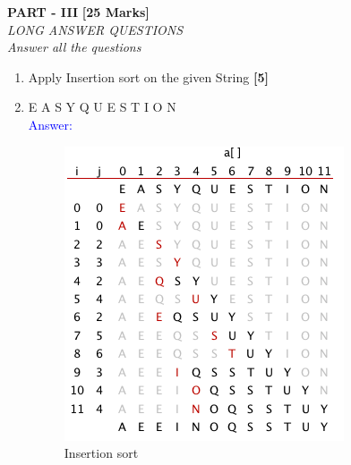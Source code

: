\documentclass[12pt ,a4paper]{exam}
\begin{document}
	\pagebreak
	\begin{center}
		\textbf{PART - III} \textbf{[25 Marks]}\\
		\noindent \textit{LONG ANSWER QUESTIONS} \\
		\noindent \textit{Answer all the questions}  
	\end{center}
	
	\begin{enumerate}[start=1,label={\bfseries Q\arabic*)}]
	\item Apply Insertion sort on the given String \hfill\textbf{[5]} \\
	\item [] E A S Y  Q U E S T I O N\\
	\textcolor{blue}{Answer: }
	\begin{figure}[h]
		\centering
		\includegraphics[width=0.5\linewidth]{"Screenshot 2020-12-26 at 10.04.38 PM"}
		\caption{Insertion sort}
		\label{fig:screenshot-2020-12-26-at-10}
	\end{figure}
	

\end{enumerate}
\end{document}
